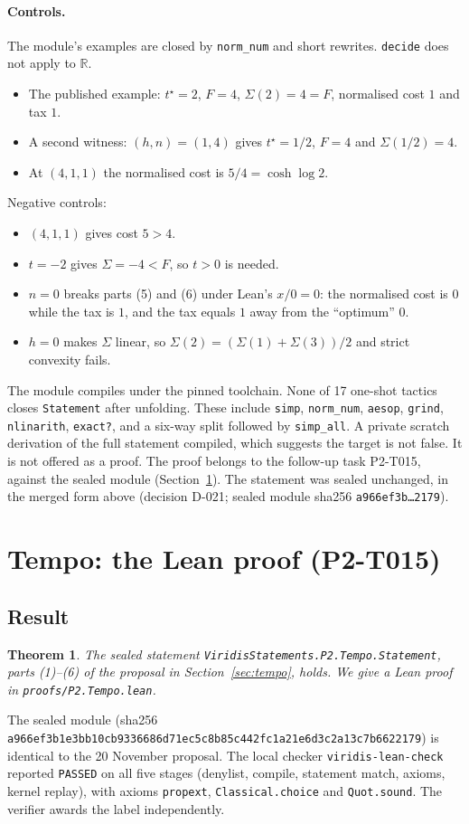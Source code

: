 \documentclass[11pt]{article}
\newtheorem{theorem}{Theorem}
\theoremstyle{definition}
\theoremstyle{remark}
\begin{document}
\paragraph{Controls.} The module's examples are closed by \texttt{norm\_num} and short rewrites.
\texttt{decide} does not apply to $\mathbb{R}$.
\begin{itemize}
\item The published example: $t^\star=2$, $F=4$, $\Sigma(2)=4=F$, normalised cost $1$ and tax $1$.
\item A second witness: $(h,n)=(1,4)$ gives $t^\star=1/2$, $F=4$ and $\Sigma(1/2)=4$.
\item At $(4,1,1)$ the normalised cost is $5/4=\cosh\log 2$.
\end{itemize}
Negative controls:
\begin{itemize}
\item $(4,1,1)$ gives cost $5>4$.
\item $t=-2$ gives $\Sigma=-4<F$, so $t>0$ is needed.
\item $n=0$ breaks parts (5) and (6) under Lean's $x/0=0$: the normalised cost is $0$ while the tax is $1$, and the tax equals $1$ away from the ``optimum'' $0$.
\item $h=0$ makes $\Sigma$ linear, so $\Sigma(2)=(\Sigma(1)+\Sigma(3))/2$ and strict convexity fails.
\end{itemize}
The module compiles under the pinned toolchain. None of 17 one-shot tactics closes \texttt{Statement} after unfolding.
These include \texttt{simp}, \texttt{norm\_num}, \texttt{aesop}, \texttt{grind}, \texttt{nlinarith}, \texttt{exact?}, and a six-way split followed by \texttt{simp\_all}.
A private scratch derivation of the full statement compiled, which suggests the target is not false.
It is not offered as a proof. The proof belongs to the follow-up task P2-T015, against the sealed module (Section~\ref{sec:tempoproof}).
The statement was sealed unchanged, in the merged form above (decision D-021; sealed module sha256 \texttt{a966ef3b\ldots 2179}).

\section{Tempo: the Lean proof (P2-T015)}\label{sec:tempoproof}
\subsection{Result}
\begin{theorem}\label{thm:tempo}
The sealed statement \texttt{ViridisStatements.P2.Tempo.Statement}, parts (1)--(6) of the proposal in Section~\ref{sec:tempo}, holds.
We give a Lean proof in \texttt{proofs/P2.Tempo.lean}.
\end{theorem}
The sealed module (sha256 \texttt{a966ef3b1e3bb10cb9336686d71ec5c8b85c442fc1a21e6d3c2a13c7b6622179}) is identical to the
20 November proposal. The local checker \texttt{viridis-lean-check} reported \texttt{PASSED} on all five stages (denylist, compile,
statement match, axioms, kernel replay), with axioms \texttt{propext}, \texttt{Classical.choice} and \texttt{Quot.sound}.
The verifier awards the label independently.
\end{document}
